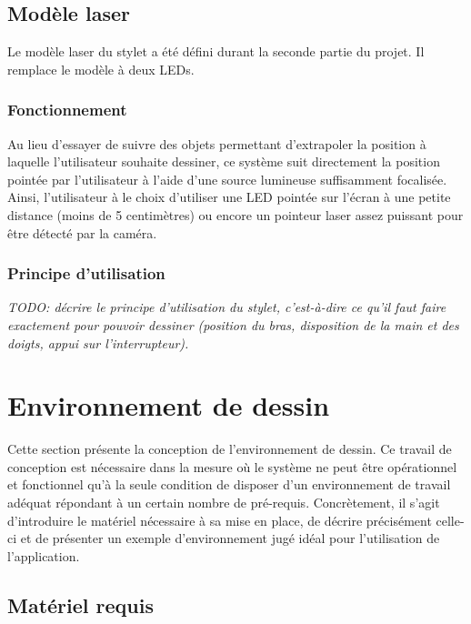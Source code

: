 \documentclass[11pt,a4paper,oldfontcommands]{memoir}
\begin{document}
\newpage

\subsection{Modèle laser}

Le modèle laser du stylet a été défini durant la seconde partie du projet. Il remplace le modèle à deux LEDs.

\subsubsection{Fonctionnement}

Au lieu d'essayer de suivre des objets permettant d'extrapoler la position à laquelle l'utilisateur souhaite dessiner, ce système suit directement la position pointée par l'utilisateur à l'aide d'une source lumineuse suffisamment focalisée.
Ainsi, l'utilisateur à le choix d'utiliser une LED pointée sur l'écran à une petite distance (moins de 5 centimètres) ou encore un pointeur laser assez puissant pour être détecté par la caméra.

\subsubsection{Principe d'utilisation}

\textit{TODO: décrire le principe d'utilisation du stylet, c'est-à-dire ce qu'il faut faire exactement pour pouvoir dessiner (position du bras, disposition de la main et des doigts, appui sur l'interrupteur).}

\newpage

\section{Environnement de dessin}

Cette section présente la conception de l'environnement de dessin. Ce travail de conception est nécessaire dans la mesure où le système ne peut être opérationnel et fonctionnel qu'à la seule condition de disposer d'un environnement de travail adéquat répondant à un certain nombre de pré-requis. Concrètement, il s'agit d'introduire le matériel nécessaire à sa mise en place, de décrire précisément celle-ci et de présenter un exemple d'environnement jugé idéal pour l'utilisation de l'application.

\subsection{Matériel requis}
\end{document}
